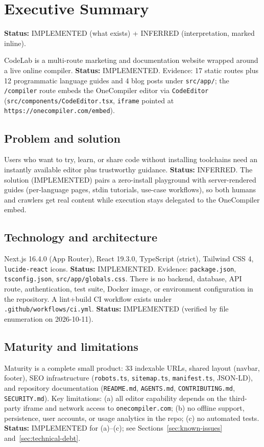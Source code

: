 \section{Executive Summary}
\label{sec:executive-summary}

\textbf{Status:} IMPLEMENTED (what exists) + INFERRED (interpretation, marked inline).

CodeLab is a multi-route marketing and documentation website wrapped around a live online compiler. \textbf{Status:} IMPLEMENTED. Evidence: 17 static routes plus 12 programmatic language guides and 4 blog posts under \texttt{src/app/}; the \texttt{/compiler} route embeds the OneCompiler editor via \texttt{CodeEditor} (\texttt{src/components/CodeEditor.tsx}, \texttt{iframe} pointed at \texttt{https://onecompiler.com/embed}).

\subsection{Problem and solution}
Users who want to try, learn, or share code without installing toolchains need an instantly available editor plus trustworthy guidance. \textbf{Status:} INFERRED. The solution (IMPLEMENTED) pairs a zero-install playground with server-rendered guides (per-language pages, stdin tutorials, use-case workflows), so both humans and crawlers get real content while execution stays delegated to the OneCompiler embed.

\subsection{Technology and architecture}
Next.js 16.4.0 (App Router), React 19.3.0, TypeScript (strict), Tailwind CSS 4, \texttt{lucide-react} icons. \textbf{Status:} IMPLEMENTED. Evidence: \texttt{package.json}, \texttt{tsconfig.json}, \texttt{src/app/globals.css}. There is no backend, database, API route, authentication, test suite, Docker image, or environment configuration in the repository. A lint+build CI workflow exists under \texttt{.github/workflows/ci.yml}. \textbf{Status:} IMPLEMENTED (verified by file enumeration on 2026-10-11).

\subsection{Maturity and limitations}
Maturity is a complete small product: 33 indexable URLs, shared layout (navbar, footer), SEO infrastructure (\texttt{robots.ts}, \texttt{sitemap.ts}, \texttt{manifest.ts}, JSON-LD), and repository documentation (\texttt{README.md}, \texttt{AGENTS.md}, \texttt{CONTRIBUTING.md}, \texttt{SECURITY.md}). Key limitations: (a) all editor capability depends on the third-party iframe and network access to \texttt{onecompiler.com}; (b) no offline support, persistence, user accounts, or usage analytics in the repo; (c) no automated tests. \textbf{Status:} IMPLEMENTED for (a)--(c); see Sections~\ref{sec:known-issues} and~\ref{sec:technical-debt}.
